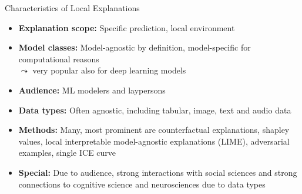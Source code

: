 \documentclass[11pt,compress,t,notes=noshow, aspectratio=169, xcolor=table]{beamer}
\begin{document}
\begin{frame}[c]{Characteristics of Local Explanations}
	\begin{itemize}[<+->]
		\item \textbf{Explanation scope:} Specific prediction, local environment
		\item \textbf{Model classes:} Model-agnostic by definition, model-specific for computational reasons\\
		$\leadsto$ very popular also for deep learning models
		\item \textbf{Audience:} ML modelers and laypersons
		\item \textbf{Data types:} Often agnostic, including tabular, image, text and audio data
		\item \textbf{Methods:} Many, most prominent are counterfactual explanations, shapley values, local interpretable model-agnostic explanations (LIME), adversarial examples, single ICE curve%
		\item \textbf{Special:} Due to audience, strong interactions with social sciences and strong connections to cognitive science and neurosciences due to data types
	\end{itemize}
\end{frame}

\end{document}
